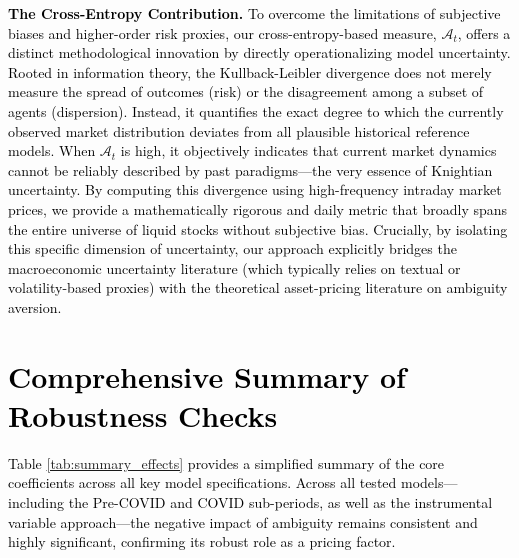 \documentclass[preprint,12pt,authoryear]{elsarticle}
\begin{document}
\textcolor{black}{\textbf{The Cross-Entropy Contribution.} To overcome the limitations of subjective biases and higher-order risk proxies, our cross-entropy-based measure, $\mathcal{A}_t$, offers a distinct methodological innovation by directly operationalizing model uncertainty. Rooted in information theory, the Kullback-Leibler divergence does not merely measure the spread of outcomes (risk) or the disagreement among a subset of agents (dispersion). Instead, it quantifies the exact degree to which the currently observed market distribution deviates from all plausible historical reference models. When $\mathcal{A}_t$ is high, it objectively indicates that current market dynamics cannot be reliably described by past paradigms—the very essence of Knightian uncertainty. By computing this divergence using high-frequency intraday market prices, we provide a mathematically rigorous and daily metric that broadly spans the entire universe of liquid stocks without subjective bias. Crucially, by isolating this specific dimension of uncertainty, our approach explicitly bridges the macroeconomic uncertainty literature (which typically relies on textual or volatility-based proxies) with the theoretical asset-pricing literature on ambiguity aversion.}

\section{\textcolor{black}{Comprehensive Summary of Robustness Checks}}
\label{app:summary_effects}
\renewcommand{\theequation}{C.\arabic{equation}}
\setcounter{equation}{0}

\renewcommand{\thetable}{C.\arabic{table}}
\setcounter{table}{0}

\textcolor{black}{Table \ref{tab:summary_effects} provides a simplified summary of the core coefficients across all key model specifications. Across all tested models—including the Pre-COVID and COVID sub-periods, as well as the instrumental variable approach—the negative impact of ambiguity remains consistent and highly significant, confirming its robust role as a pricing factor.}
\end{document}
